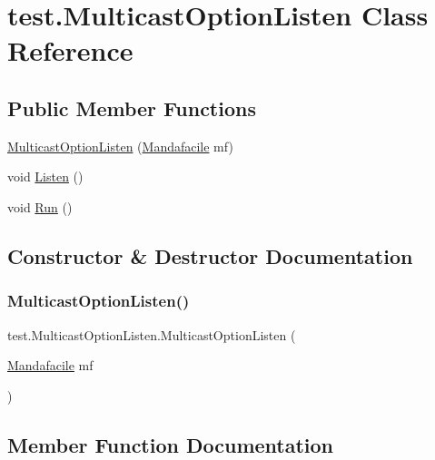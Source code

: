 \hypertarget{classtest_1_1_multicast_option_listen}{}\section{test.\+Multicast\+Option\+Listen Class Reference}
\label{classtest_1_1_multicast_option_listen}
\subsection*{Public Member Functions}
\begin{DoxyCompactItemize}
\item 
\hyperlink{classtest_1_1_multicast_option_listen_ad333d75381a9b74f5e043fa43239df88}{Multicast\+Option\+Listen} (\hyperlink{classtest_1_1_mandafacile}{Mandafacile} mf)
\item 
void \hyperlink{classtest_1_1_multicast_option_listen_a964946cbee31b9aa93bbeaea0165bd4d}{Listen} ()
\item 
void \hyperlink{classtest_1_1_multicast_option_listen_afe9f8040b3198b5923c61089804e82e7}{Run} ()
\end{DoxyCompactItemize}


\subsection{Constructor \& Destructor Documentation}
\mbox{\label{classtest_1_1_multicast_option_listen_ad333d75381a9b74f5e043fa43239df88}} 
\subsubsection{\texorpdfstring{Multicast\+Option\+Listen()}{MulticastOptionListen()}}
{\footnotesize\ttfamily test.\+Multicast\+Option\+Listen.\+Multicast\+Option\+Listen (\begin{DoxyParamCaption}\item[{\hyperlink{classtest_1_1_mandafacile}{Mandafacile}}]{mf }\end{DoxyParamCaption})}



\subsection{Member Function Documentation}
\mbox{\label{classtest_1_1_multicast_option_listen_a964946cbee31b9aa93bbeaea0165bd4d}} 
